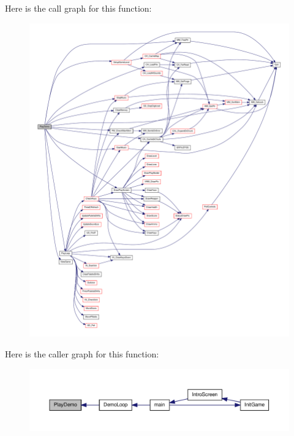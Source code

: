 Here is the call graph for this function:
\nopagebreak
\begin{figure}[H]
\begin{center}
\leavevmode
\includegraphics[width=400pt]{WL__DEF_8H_a55c9fa06b5f7b6dc6805e3721a15922a_cgraph}
\end{center}
\end{figure}




Here is the caller graph for this function:
\nopagebreak
\begin{figure}[H]
\begin{center}
\leavevmode
\includegraphics[width=400pt]{WL__DEF_8H_a55c9fa06b5f7b6dc6805e3721a15922a_icgraph}
\end{center}
\end{figure}


